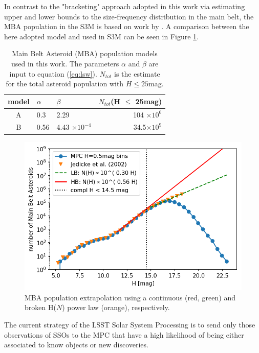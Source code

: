In contrast to the "bracketing" approach adopted in this work via estimating upper and lower bounds to the size-frequency distribution in the main belt, the \gls{MBA} population in the S3M is based on work by \citet{jedicke2002}. A comparison between the here adopted model and \citet{jedicke2002} used in S3M can be seen in Figure \ref{fig:mba_pop}.
\begin{table}[t!]
\begin{center}
\begin{tabular}{cllr}
\hline
model & $\alpha$ & $\beta$ & $N_{tot}$(H $\le$ 25mag) \\
\hline
A & 0.3 &  2.29 & 104 $\times 10^{6}$ \\
B & 0.56 &4.43 $\times 10^{-4}$ & 34.5$\times 10^{9}$\\
\hline
\end{tabular}
\end{center}
\caption{Main Belt Asteroid (\gls{MBA}) population models used in this work. The parameters $\alpha$ and $\beta$ are input to equation (\ref{eq:lsw}). $N_{tot}$ is the estimate for the total asteroid population with $H\le 25$mag. }
\label{tab:mbapop}
\end{table}
\begin{figure}[b!]
\begin{center}
\includegraphics[scale=.8]{figs/mpc_population_4.png}
\end{center}
\caption{MBA population extrapolation using a continuous (red, green) and broken H($N$) power law (orange), respectively.}
\label{fig:mba_pop}       %
\end{figure} 
%
The current strategy of the \gls{LSST} Solar System Processing is to send only those observations of SSOs to the \gls{MPC} that have a high likelihood of being either associated to know objects or new discoveries. 
